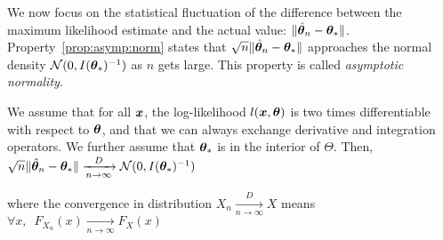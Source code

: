 We now focus on the statistical fluctuation of the difference between the
maximum likelihood estimate and the actual value: $\|\hat{\boldsymbol{\theta}}_n -
\boldsymbol{\theta}_*\|$. Property~\ref{prop:asymp:norm} states that
$\sqrt{n}\|\hat{\boldsymbol{\theta}}_n - \boldsymbol{\theta}_*\|$ approaches the normal density
$\mathcal{N}(0, I(\boldsymbol{\theta}_*)^{-1})$ as $n$ gets large. This property is called \emph{asymptotic normality}.

\begin{prop}
  \label{prop:asymp:norm}
  We assume that for all $\boldsymbol{x}$, the log-likelihood $l(\boldsymbol{x}, \boldsymbol{\theta})$ is two times differentiable with respect to $\boldsymbol{\theta}$, and that we
  can always exchange derivative and integration operators. We further assume
  that $\boldsymbol{\theta}_*$ is in the interior of $\Theta$.
  Then,
  $\sqrt{n} \| \hat{\boldsymbol{\theta}}_n - \boldsymbol{\theta}_* \| \xrightarrow[n \rightarrow
  \infty]{D}  \mathcal{N}(0,
  I(\boldsymbol{\theta}_*)^{-1})$
\end{prop}
where the convergence in distribution $ X_n \xrightarrow[n \rightarrow \infty]{D} X$ means  $\forall x, \enspace F_{X_n}(x)
\xrightarrow[n \rightarrow \infty]{} F_X(x)$
